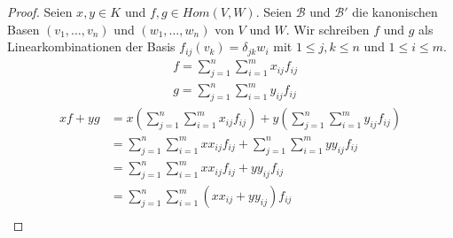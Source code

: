 \documentclass[a4paper,10pt]{article}
\begin{document}
\begin{proof}
 Seien $x, y \in K$ und $f, g \in Hom(V, W)$.
 Seien $\mathcal{B}$ und $\mathcal{B}'$ die kanonischen Basen $(v_1, \dots, v_n)$ und $(w_1, \dots, w_n)$ von $V$ und $W$.
 Wir schreiben $f$ und $g$ als Linearkombinationen der Basis $f_{ij}(v_k) = \delta_{jk} w_i$ mit $1 \le j, k \le n$ und $1 \le i \le m$.
 \begin{align}
  & f = \sum_{j = 1}^n \sum_{i = 1}^m x_{ij}f_{ij}\\
  & g = \sum_{j = 1}^n \sum_{i = 1}^m y_{ij}f_{ij}
 \end{align}
 \begin{align*}
  xf + yg & = x(\sum_{j = 1}^n \sum_{i = 1}^m x_{ij}f_{ij}) + y(\sum_{j = 1}^n \sum_{i = 1}^m y_{ij}f_{ij})\\
  & = \sum_{j = 1}^n \sum_{i = 1}^m xx_{ij}f_{ij} + \sum_{j = 1}^n \sum_{i = 1}^m yy_{ij}f_{ij}\\
  & = \sum_{j = 1}^n \sum_{i = 1}^m xx_{ij}f_{ij} + yy_{ij}f_{ij}\\
  & = \sum_{j = 1}^n \sum_{i = 1}^m (xx_{ij} + yy_{ij})f_{ij}\\
 \end{align*}


\end{proof}
\end{document}
